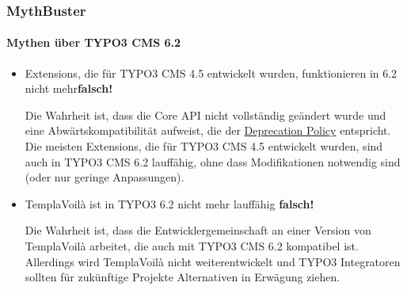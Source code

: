 
\begin{frame}[fragile]
	\frametitle{MythBuster}
	\framesubtitle{Mythen über TYPO3 CMS 6.2}

	\begin{itemize}

		\item Extensions, die für TYPO3 CMS 4.5 entwickelt wurden,\newline
			funktionieren in 6.2 nicht mehr\tabto{9cm}\color{red}\textbf{\textrightarrow falsch!}\color{black}

			\smaller
				Die Wahrheit ist, dass die Core API nicht vollständig geändert wurde und eine Abwärtskompatibilität aufweist, die der \href{http://forge.typo3.org/projects/typo3v4-core/wiki/CoreDevPolicy}{Deprecation Policy} entspricht. Die meisten Extensions, die für TYPO3 CMS 4.5 entwickelt wurden, sind auch in TYPO3 CMS 6.2 lauffähig, ohne dass Modifikationen notwendig sind (oder nur geringe Anpassungen).
			\normalsize
			\newline

		\item TemplaVoilà ist in TYPO3 6.2 nicht mehr lauffähig
			\tabto{9cm}\color{red}\textbf{\textrightarrow falsch!}\color{black}

			\smaller
				Die Wahrheit ist, dass die Entwicklergemeinschaft an einer Version von TemplaVoilà arbeitet, die auch mit TYPO3 CMS 6.2 kompatibel ist. Allerdings wird TemplaVoilà nicht weiterentwickelt und TYPO3 Integratoren sollten für zukünftige Projekte Alternativen in Erwägung ziehen.
			\normalsize

	\end{itemize}

\end{frame}


